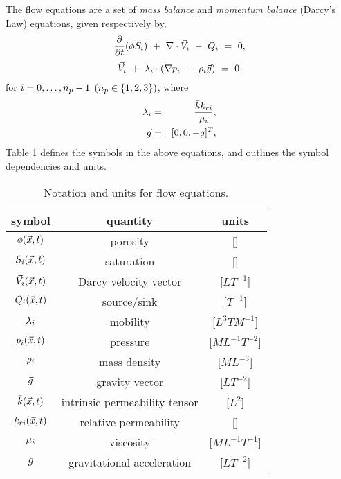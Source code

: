 The flow equations are a set of {\em mass balance} and
{\em momentum balance} (Darcy's Law) equations, given respectively by,
\begin{equation} \label{eqn-mass-balance}
\frac{\partial}{\partial t} ( \phi S_i )
  ~+~ \nabla \cdot {\vec V}_i
  ~-~ Q_i ~=~ 0 ,
\end{equation}
\begin{equation} \label{eqn-darcy}
{\vec V}_i ~+~ {\lambda}_i \cdot ( \nabla p_i ~-~ \rho_i {\vec g} ) ~=~ 0 ,
\end{equation}
for $i = 0, \ldots , n_p - 1$ $(n_p \in \{1,2,3\})$, where
\begin{eqnarray} \label{eqn-phase-mobility}
{\lambda}_i & = & \frac{{\bar k} k_{ri}}{\mu_i} , \\
{\vec g}    & = & [ 0, 0, -g ]^T ,
\end{eqnarray}
Table \ref{table-flow-units} defines the symbols in the above equations,
and outlines the symbol dependencies and units.
\begin{table} \center
\caption{Notation and units for flow equations.}
\smallskip
\begin{tabular}{||c||c|c||}
\hline
symbol & quantity & units \\
\hline\hline
$\phi ({\vec x},t)$ & porosity                      & []                  \\ \hline
$S_i ({\vec x},t)$  & saturation                    & []                  \\ \hline
${\vec V}_i ({\vec x},t)$  & Darcy velocity vector         & [$L T^{-1}$]        \\ \hline
$Q_i ({\vec x},t)$  & source/sink                   & [$T^{-1}$]          \\ \hline
${\lambda}_i$        & mobility                      & [$L^{3} T M^{-1}$]  \\ \hline
$p_i ({\vec x},t)$  & pressure                      & [$M L^{-1} T^{-2}$] \\ \hline
$\rho_i$        & mass density                  & [$M L^{-3}$]        \\ \hline
${\vec g}$           & gravity vector                & [$L T^{-2}$]        \\ \hline
${\bar k} ({\vec x},t)$   & intrinsic permeability tensor & [$L^{2}$]           \\ \hline
$k_{ri} ({\vec x},t)$ & relative permeability         & []                  \\ \hline
$\mu_i$        & viscosity                     & [$M L^{-1} T^{-1}$] \\ \hline
$g$             & gravitational acceleration    & [$L T^{-2}$]        \\ \hline
\end{tabular}
\label{table-flow-units}
\end{table}
